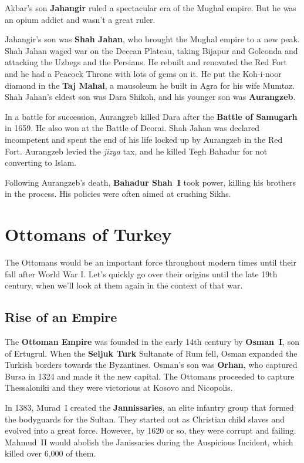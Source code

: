 Akbar's son \textbf{Jahangir} ruled a spectacular era of the Mughal empire.
But he was an opium addict and wasn't a great ruler.

Jahangir's son was \textbf{Shah Jahan}, who brought the Mughal empire to a new peak.
Shah Jahan waged war on the Deccan Plateau,
taking Bijapur and Golconda and attacking the Uzbegs and the Persians.
He rebuilt and renovated the Red Fort and he had a Peacock Throne with lots of gems on it.
He put the Koh-i-noor diamond in the \textbf{Taj Mahal},
a mausoleum he built in Agra for his wife Mumtaz.
Shah Jahan's eldest son was Dara Shikoh, and his younger son was \textbf{Aurangzeb}.

In a battle for succession, Aurangzeb killed Dara after the \textbf{Battle of Samugarh} in 1659.
He also won at the Battle of Deorai.
Shah Jahan was declared incompetent
and spent the end of his life locked up by Aurangzeb in the Red Fort.
Aurangzeb levied the \textit{jizya} tax, and he killed Tegh Bahadur for not converting to Islam.

Following Aurangzeb's death, \textbf{Bahadur Shah~I} took power, killing his brothers in the process.
His policies were often aimed at crushing Sikhs.

\section{Ottomans of Turkey}

The Ottomans would be an important force throughout modern times
until their fall after World War I\@.
Let's quickly go over their origins until the late 19th century,
when we'll look at them again in the context of that war.

\subsection*{Rise of an Empire}

The \textbf{Ottoman Empire} was founded in the early 14th century by \textbf{Osman~I},
son of Ertugrul.
When the \textbf{Seljuk Turk} Sultanate of Rum fell,
Osman expanded the Turkish borders towards the Byzantines.
Osman's son was \textbf{Orhan}, who captured Bursa in 1324 and made it the new capital.
The Ottomans proceeded to capture Thessaloniki and they were victorious at Kosovo and Nicopolis.

In 1383, Murad~I created the \textbf{Jannissaries},
an elite infantry group that formed the bodyguards for the Sultan.
They started out as Christian child slaves and evolved into a great force.
However, by 1620 or so, they were corrupt and failing.
Mahmud~II would abolish the Janissaries during the Auspicious Incident,
which killed over 6,000 of them.

